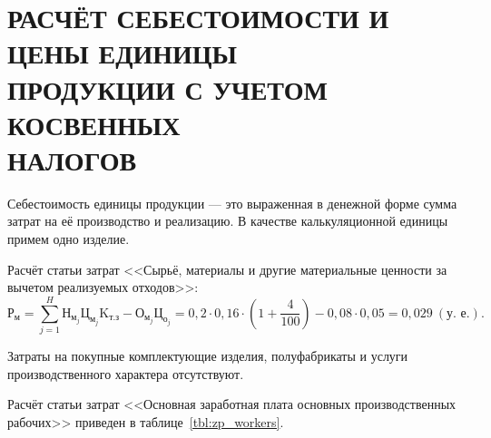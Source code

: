 \section[%
Расчёт себестоимости и цены единицы продукции с учетом \\
косвенных налогов
]{%
РАСЧЁТ СЕБЕСТОИМОСТИ И ЦЕНЫ ЕДИНИЦЫ \\
ПРОДУКЦИИ С УЧЕТОМ КОСВЕННЫХ \\
НАЛОГОВ
}
\label{sec:cost}

Себестоимость единицы продукции --- это выраженная в денежной форме
сумма затрат на её производство и реализацию.
В качестве калькуляционной единицы примем одно изделие.

Расчёт статьи затрат 
<<Сырьё, материалы и другие материальные ценности
за вычетом реализуемых отходов>>:
\begin{equation*}
\text{Р}_{\text{м}} = 
\sum^{H}_{j=1} \text{Н}_{\text{м}_j} \text{Ц}_{\text{м}_j} \text{K}_{\text{т.з}} 
- \text{О}_{\text{м}_j} \text{Ц}_{\text{о}_j} = 
0{,}2 \cdot 0{,}16 \cdot (1 + \dfrac{4}{100}) - 0{,}08 \cdot 0{,}05 =
0{,}029 \: (\text{у.~е.}).
\end{equation*}

Затраты на покупные комплектующие изделия, 
полуфабрикаты и услуги производственного характера отсутствуют.

Расчёт статьи затрат
<<Основная заработная плата основных производственных рабочих>>
приведен в таблице~\ref{tbl:zp_workers}.

